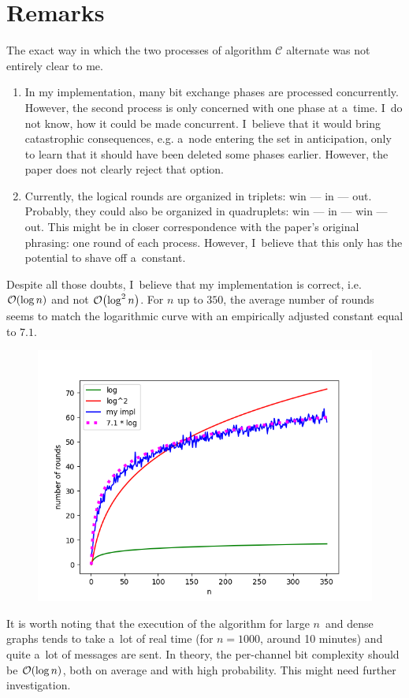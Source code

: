 \documentclass{article}
\DeclarePairedDelimiter{\parenthesesdelimiter}{(}{)}
\def\pars{\parenthesesdelimiter*}
\newcommand{\bigO}{\mathcal{O}}
\begin{document}
\section{Remarks}
The exact way in which the two processes of algorithm \(\mathcal{C}\) alternate was not entirely clear to me.
\begin{enumerate}
    \item In my implementation, many bit exchange phases are processed concurrently. However, the second process is only concerned with one phase at a~time. I~do not know, how it could be made concurrent. I~believe that it would bring catastrophic consequences, e.g. a~node entering the set in anticipation, only to learn that it should have been deleted some phases earlier. However, the paper does not clearly reject that option.
    \item Currently, the logical rounds are organized in triplets: win --- in --- out. Probably, they could also be organized in quadruplets: win --- in --- win --- out. This might be in closer correspondence with the paper's original phrasing: one round of each process. However, I~believe that this only has the potential to shave off a~constant.
\end{enumerate}
Despite all those doubts, I~believe that my implementation is correct, i.e. \(\bigO\pars{\log n}\) and not \(\bigO\pars{\log^2n}\). For \(n\) up to \(350\), the average number of rounds seems to match the logarithmic curve with an empirically adjusted constant equal to \(7.1\).
\begin{figure}[H]
    \centering
    \includegraphics{comparison.png}
\end{figure}
It is worth noting that the execution of the algorithm for large \(n\)~and dense graphs tends to take a~lot of real time (for \(n = 1000\), around 10 minutes) and quite a~lot of messages are sent. In theory, the per-channel bit complexity should be \(\bigO\pars{\log n}\), both on average and with high probability. This might need further investigation.



\end{document}

